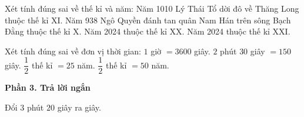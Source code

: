 \begin{ex} %
Xét tính đúng sai về thế kỉ và năm:
\choiceTF
{\True Năm 1010 Lý Thái Tổ dời đô về Thăng Long thuộc thế kỉ XI.}
{\True Năm 938 Ngô Quyền đánh tan quân Nam Hán trên sông Bạch Đằng thuộc thế kỉ X.}
{Năm 2024 thuộc thế kỉ XX.}
{\True Năm 2024 thuộc thế kỉ XXI.}
\end{ex}

\begin{ex} %
Xét tính đúng sai về đơn vị thời gian:
\choiceTF
{\True $1$ giờ $= 3600$ giây.}
{\True $2$ phút $30$ giây $= 150$ giây.}
{$\dfrac{1}{2}$ thế kỉ $= 25$ năm.}
{\True $\dfrac{1}{2}$ thế kỉ $= 50$ năm.}
\end{ex}

\textbf{Phần 3. Trả lời ngắn}

\begin{ex} %
Đổi $3$ phút $20$ giây ra giây.
\end{ex}

